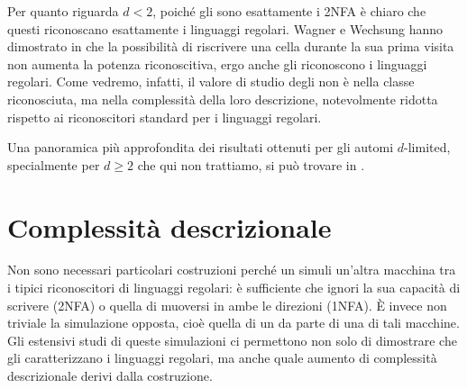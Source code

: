 Per quanto riguarda $d<2$, poiché gli  sono esattamente i 2NFA è chiaro che questi riconoscano esattamente i linguaggi regolari. Wagner e Wechsung hanno dimostrato in \cite{Wagner:86:compCompl} che la possibilità di riscrivere una cella durante la sua prima visita non aumenta la potenza riconoscitiva, ergo anche gli  riconoscono i linguaggi regolari. Come vedremo, infatti, il valore di studio degli  non è nella classe riconosciuta, ma nella complessità della loro descrizione, notevolmente ridotta rispetto ai riconoscitori standard per i linguaggi regolari.

Una panoramica più approfondita dei risultati ottenuti per gli automi $d$-limited, specialmente per $d\geq2$ che qui non trattiamo, si può trovare in \cite{Pighizzini:19:limited}.



\section{Complessità descrizionale}
Non sono necessari particolari costruzioni perché un  simuli un'altra macchina tra i tipici riconoscitori di linguaggi regolari: è sufficiente che ignori la sua capacità di scrivere (2NFA) o quella di muoversi in ambe le direzioni (1NFA). È invece non triviale la simulazione opposta, cioè quella di un  da parte di una di tali macchine. Gli estensivi studi di queste simulazioni ci permettono non solo di dimostrare che gli  caratterizzano i linguaggi regolari, ma anche quale aumento di complessità descrizionale derivi dalla costruzione.


